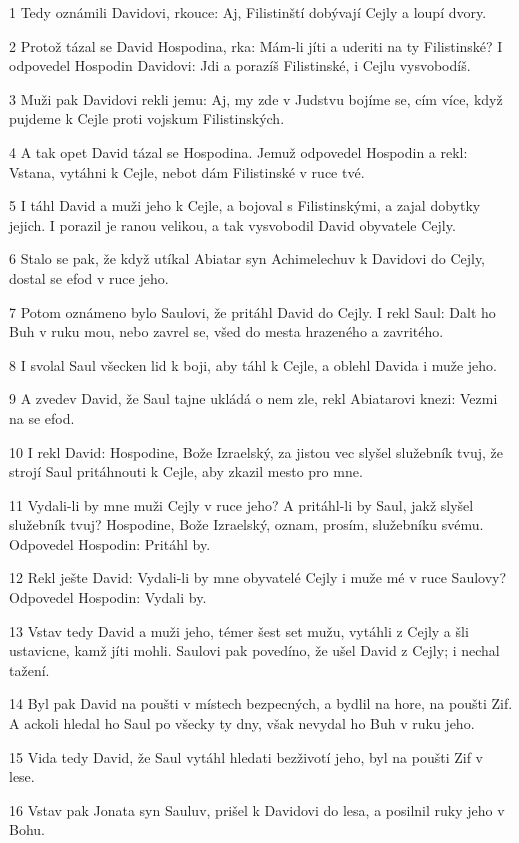 \par 1 Tedy oznámili Davidovi, rkouce: Aj, Filistinští dobývají Cejly a loupí dvory.
\par 2 Protož tázal se David Hospodina, rka: Mám-li jíti a uderiti na ty Filistinské? I odpovedel Hospodin Davidovi: Jdi a porazíš Filistinské, i Cejlu vysvobodíš.
\par 3 Muži pak Davidovi rekli jemu: Aj, my zde v Judstvu bojíme se, cím více, když pujdeme k Cejle proti vojskum Filistinských.
\par 4 A tak opet David tázal se Hospodina. Jemuž odpovedel Hospodin a rekl: Vstana, vytáhni k Cejle, nebot dám Filistinské v ruce tvé.
\par 5 I táhl David a muži jeho k Cejle, a bojoval s Filistinskými, a zajal dobytky jejich. I porazil je ranou velikou, a tak vysvobodil David obyvatele Cejly.
\par 6 Stalo se pak, že když utíkal Abiatar syn Achimelechuv k Davidovi do Cejly, dostal se efod v ruce jeho.
\par 7 Potom oznámeno bylo Saulovi, že pritáhl David do Cejly. I rekl Saul: Dalt ho Buh v ruku mou, nebo zavrel se, všed do mesta hrazeného a zavritého.
\par 8 I svolal Saul všecken lid k boji, aby táhl k Cejle, a oblehl Davida i muže jeho.
\par 9 A zvedev David, že Saul tajne ukládá o nem zle, rekl Abiatarovi knezi: Vezmi na se efod.
\par 10 I rekl David: Hospodine, Bože Izraelský, za jistou vec slyšel služebník tvuj, že strojí Saul pritáhnouti k Cejle, aby zkazil mesto pro mne.
\par 11 Vydali-li by mne muži Cejly v ruce jeho? A pritáhl-li by Saul, jakž slyšel služebník tvuj? Hospodine, Bože Izraelský, oznam, prosím, služebníku svému. Odpovedel Hospodin: Pritáhl by.
\par 12 Rekl ješte David: Vydali-li by mne obyvatelé Cejly i muže mé v ruce Saulovy? Odpovedel Hospodin: Vydali by.
\par 13 Vstav tedy David a muži jeho, témer šest set mužu, vytáhli z Cejly a šli ustavicne, kamž jíti mohli. Saulovi pak povedíno, že ušel David z Cejly; i nechal tažení.
\par 14 Byl pak David na poušti v místech bezpecných, a bydlil na hore, na poušti Zif. A ackoli hledal ho Saul po všecky ty dny, však nevydal ho Buh v ruku jeho.
\par 15 Vida tedy David, že Saul vytáhl hledati bezživotí jeho, byl na poušti Zif v lese.
\par 16 Vstav pak Jonata syn Sauluv, prišel k Davidovi do lesa, a posilnil ruky jeho v Bohu.
